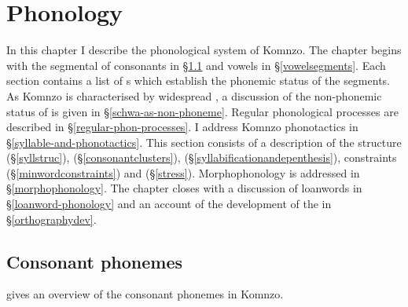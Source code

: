 
\chapter{Phonology} \label{cha:Phonology}

In this chapter I describe the phonological system of Komnzo. The chapter begins with the segmental  of consonants in \S{}\ref{consonant-segments} and vowels in \S{}\ref{vowelsegments}. Each section contains a list of s which establish the phonemic status of the segments. As Komnzo  is characterised by widespread , a discussion of the non-phonemic status of  is given in \S{}\ref{schwa-as-non-phoneme}. Regular phonological processes are described in \S{}\ref{regular-phon-processes}. I address Komnzo phonotactics in \S{}\ref{syllable-and-phonotactics}. This section consists of a description of the  structure (\S{}\ref{syllstruc}),  (\S{}\ref{consonantclusters}),  (\S{}\ref{syllabificationandepenthesis}),  constraints (\S{}\ref{minwordconstraints}) and  (\S{}\ref{stress}). Morphophonology is addressed in \S{}\ref{morphophonology}. The chapter closes with a discussion of loanwords in \S{}\ref{loanword-phonology} and an account of the development of the  in \S{}\ref{orthographydev}.
\vspace{-0,3cm}

\section{Consonant phonemes} \label{consonant-segments}

 gives an overview of the consonant phonemes in Komnzo. %

